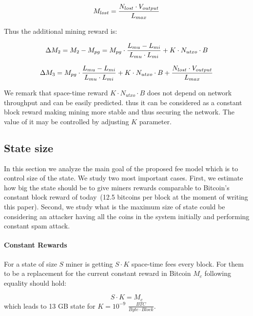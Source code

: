 \documentclass[]{llncs}   %
\begin{document}
\begin{equation}
M_{lost} = {N_{lost} \cdot V_{output} \over L_{max}}
\end{equation}

Thus the additional mining reward is:

\begin{equation}
\Delta M_2 = M_2 - M_{pg} = M_{pg} \cdot {{L_{mu}-L_{mi}} \over {L_{mu} \cdot L_{mi}}} + K \cdot N_{utxo} \cdot B
\end{equation}

\begin{equation}
\Delta M_3 = M_{pg} \cdot {{L_{mu}-L_{mi}} \over {L_{mu} \cdot L_{mi}}} + K \cdot N_{utxo} \cdot B + {N_{lost} \cdot V_{output} \over L_{max}}
\end{equation}

We remark that space-time reward $K \cdot N_{utxo} \cdot B$ does not depend on network throughput and can be easily predicted. thus it can be considered as a constant block reward making mining more stable and thus securing the network. The value of it may be controlled by adjusting $K$ parameter.

\subsection{State size}

In this section we analyze the main goal of the proposed fee model which is to control size of the state. We study two most important cases. First, we estimate how big the state should be to give miners rewards comparable to Bitcoin's constant block reward of today~(12.5 bitcoins per block at the moment of writing this paper). Second, we study what is the maximum size of state could be considering an attacker having all the coins in the system initially and performing constant spam attack.

\paragraph{Constant Rewards}

For a state of size $S$ miner is getting $S \cdot K$ space-time fees every block. For them to be a replacement for the current constant reward in Bitcoin $M_c$ following equality should hold:

\begin{equation}
\label{eq:statesizeexp}
S \cdot K = M_c
\end{equation}
which leads to 13 GB state for $K=10^{-9}$ $\frac{BTC}{Byte \cdot Block}$.
\end{document}
